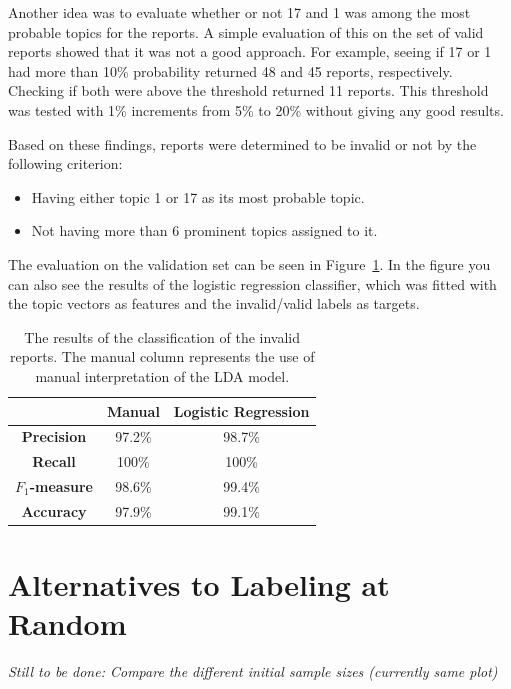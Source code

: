Another idea was to evaluate whether or not 17 and 1 was among the most probable topics for the reports.
A simple evaluation of this on the set of valid reports showed that it was not a good approach.
For example, seeing if 17 or 1 had more than 10\% probability returned 48 and 45 reports, respectively.
Checking if both were above the threshold returned 11 reports.
This threshold was tested with 1\% increments from 5\% to 20\% without giving any good results.

Based on these findings, reports were determined to be invalid or not by the following criterion:
\begin{itemize}
    \item Having either topic 1 or 17 as its most probable topic.
    \item Not having more than 6 prominent topics assigned to it.
\end{itemize}

The evaluation on the validation set can be seen in Figure~\ref{tab:exp1-eval}.
In the figure you can also see the results of the logistic regression classifier, which was fitted with the topic vectors as features and the invalid/valid labels as targets.

\begin{table}
    \centering
    \begin{tabular}{|c|cc|}
        \hline
        & \textbf{Manual} & \textbf{Logistic Regression} \\
        \hline
        \textbf{Precision} & 97.2\% & 98.7\% \\
        \textbf{Recall} & 100\% & 100\% \\
        \textbf{$F_1$-measure} & 98.6\% & 99.4\%\\
        \textbf{Accuracy} & 97.9\% & 99.1\%\\
        \hline
    \end{tabular}
    \caption{The results of the classification of the invalid reports. The manual column represents the use of manual interpretation of the LDA model.}
    \label{tab:exp1-eval}
\end{table}

\section{Alternatives to Labeling at Random}

\textit{Still to be done: Compare the different initial sample sizes (currently same plot)}


